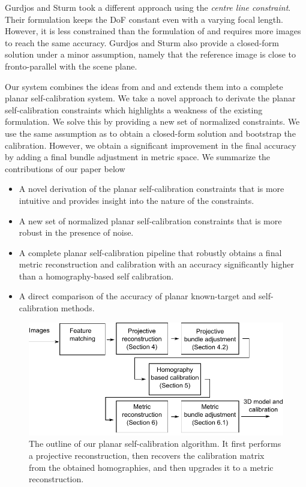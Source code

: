 \documentclass[10pt,twocolumn,letterpaper]{article}
\begin{document}
Gurdjos and Sturm \cite{gurdjos2003} took a different approach using the \emph{centre line constraint}. Their formulation keeps the DoF constant even with a varying focal length. However, it is less constrained than the formulation of \cite{bocquillon2006} and requires more images to reach the same accuracy. Gurdjos and Sturm also provide a closed-form solution under a minor assumption, namely that the reference image is close to fronto-parallel with the scene plane.

Our system combines the ideas from \cite{bocquillon2006} and \cite{gurdjos2003} and extends them into a complete planar self-calibration system. We take a novel approach to derivate the planar self-calibration constraints which highlights a weakness of the existing formulation. We solve this by providing a new set of normalized constraints. We use the same assumption as \cite{gurdjos2003} to obtain a closed-form solution and bootstrap the calibration. However, we obtain a significant improvement in the final accuracy by adding a final bundle adjustment in metric space. We summarize the contributions of our paper below
\begin{itemize}

\item A novel derivation of the planar self-calibration constraints that is more intuitive and provides insight into the nature of the constraints.

\item A new set of normalized planar self-calibration constraints that is more robust in the presence of noise.

\item A complete planar self-calibration pipeline that robustly obtains a final metric reconstruction and calibration with an accuracy significantly higher than a homography-based self calibration.

\item A direct comparison of the accuracy of planar known-target and self-calibration methods.

\end{itemize}

\begin{figure}
\includegraphics[width=\linewidth]{images/pipeline.pdf}
\caption{The outline of our planar self-calibration algorithm. It first performs a projective reconstruction, then recovers the calibration matrix from the obtained homographies, and then upgrades it to a metric reconstruction.}
\label{fig:diagram}
\end{figure}
\end{document}
